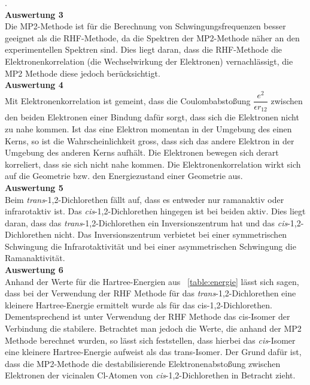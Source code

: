 \documentclass[12pt]{article}
\begin{document}
\begin{onehalfspace}
.\\
\textbf{Auswertung 3}\\
Die MP2-Methode ist für die Berechnung von Schwingungsfrequenzen besser geeignet als die RHF-Methode,
da die Spektren der MP2-Methode näher an den experimentellen Spektren sind.
Dies liegt daran, dass die RHF-Methode die Elektronenkorrelation (die Wechselwirkung der Elektronen) vernachlässigt,
die MP2 Methode diese jedoch berücksichtigt.\\
\textbf{Auswertung 4}\\
Mit Elektronenkorrelation ist gemeint, dass die Coulombabstoßung $\dfrac{e^2}{\epsilon r_{12}}$ zwischen den beiden Elektronen einer Bindung dafür sorgt, dass sich
die Elektronen nicht zu nahe kommen. Ist das eine Elektron momentan in der Umgebung des einen Kerns,
so ist die Wahrscheinlichkeit gross, dass sich das andere Elektron in der Umgebung des anderen Kerns aufhält. Die Elektronen bewegen sich derart \glqq
korreliert\grqq, dass sie sich nicht nahe kommen. Die Elektronenkorrelation wirkt sich auf die Geometrie bzw. den
Energiezustand einer Geometrie aus.\supercite{coulson}  \\
\textbf{Auswertung 5}\\
Beim \textit{trans}-1,2-Dichlorethen fällt auf, dass es entweder nur ramanaktiv oder infrarotaktiv ist.
Das \textit{cis}-1,2-Dichlorethen hingegen
 ist bei beiden aktiv. Dies liegt daran, dass das \textit{trans}-1,2-Dichlorethen ein
  Inversionszentrum hat und das \textit{cis}-1,2-Dichlorethen nicht.
Das Inversionszentrum verbietet bei einer symmetrischen Schwingung die
Infrarotaktivität und bei einer asymmetrischen Schwingung die Ramanaktivität.\\
\textbf{Auswertung 6}\\

Anhand der Werte für die Hartree-Energien aus ~\ref{table:energie} lässt sich sagen, dass
bei der Verwendung der RHF Methode für das \textit{trans}-1,2-Dichlorethen eine
kleinere Hartree-Energie ermittelt wurde als für das cis-1,2-Dichlorethen.
Dementsprechend ist unter Verwendung der RHF Methode das cis-Isomer der
Verbindung die stabilere. Betrachtet man jedoch die Werte, die anhand der MP2
Methode berechnet wurden, so lässt sich feststellen, dass hierbei das \textit{cis}-Isomer
eine kleinere Hartree-Energie aufweist als das trans-Isomer. Der Grund dafür ist, dass die MP2-Methode die destabilisierende Elektronenabstoßung
 zwischen Elektronen der vicinalen Cl-Atomen von \textit{cis}-1,2-Dichlorethen in Betracht zieht.


\end{onehalfspace}
\end{document}
